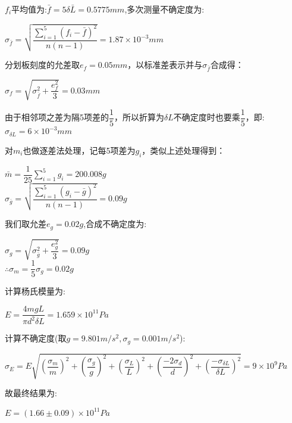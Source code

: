 \documentclass[a4 paper,12pt]{article}
\begin{document}
\par $f_{i}$平均值为:$\bar{f}=5\delta \bar{L}=0.5775mm$,多次测量不确定度为:
\begin{center}
	$\sigma_{\bar{f}}=\sqrt{\dfrac{\sum\limits_{i=1}^{5}(f_{i}-\bar{f})^{2}}{n(n-1)}}=1.87\times10^{-3}mm$
\end{center}
\par 分划板刻度的允差取$e_{f}=0.05mm$，以标准差表示并与$\sigma_{\bar{f}}$合成得：
\begin{center}
	$\sigma_{f}=\sqrt{\sigma_{\bar{f}}^{2}+\dfrac{e_{f}^{2}}{3}}=0.03mm$
\end{center}
\par 由于相邻项之差为隔5项差的$\dfrac{1}{5}$，所以折算为$\delta L$不确定度时也要乘$\dfrac{1}{5}$，即:$\sigma_{\delta L}=6\times10^{-3}mm$
\par 对$m_{i}$也做逐差法处理，记每5项差为$g_{i}$，类似上述处理得到：
\begin{center}
	$\bar{m}=\dfrac{1}{25}\sum\limits_{i=1}^{5}g_{i}=200.008g$\\
	$\sigma_{\bar{g}}=\sqrt{\dfrac{\sum\limits_{i=1}^{5}(g_{i}-\bar{g})^{2}}{n(n-1)}}=0.09g$
\end{center}
\par 我们取允差$e_{g}=0.02g$,合成不确定度为:
\begin{center}
	$\sigma_{g}=\sqrt{\sigma_{\bar{g}}^{2}+\dfrac{e_{g}^{2}}{3}}=0.09g$\\
	$\therefore \sigma_{m}=\dfrac{1}{5}\sigma_{g}=0.02g$
\end{center}
\par 计算杨氏模量为:
\begin{center}
	$E=\dfrac{4mgL}{\pi d^{2}\delta L}=1.659\times 10^{11}Pa$
\end{center}
\par 计算不确定度(取$g=9.801m/s^{2},\sigma_{g}=0.001m/s^{2}$):
\begin{center}
	$\sigma_{E}=E\sqrt{(\dfrac{\sigma_{m}}{m})^{2}+(\dfrac{\sigma_{g}}{g})^{2}+(\dfrac{\sigma_{L}}{L})^{2}+(\dfrac{-2\sigma_{d}}{d})^{2}+(\dfrac{-\sigma_{\delta L}}{\delta L})^{2}}=9\times10^{9}Pa$
\end{center}
\par 故最终结果为:
\begin{center}
	$E=(1.66\pm0.09)\times10^{11}Pa$
\end{center}
\end{document}
